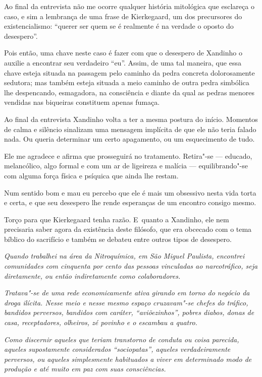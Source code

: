 \asterisc{}

Ao final da entrevista não me ocorre qualquer história mitológica que
esclareça o caso, e sim a lembrança de uma frase de Kierkegaard, um dos
precursores do existencialismo: ``querer ser quem se é realmente é na
verdade o oposto do desespero''.

Pois então, uma chave neste caso é fazer com que o desespero de Xandinho
o auxilie a encontrar seu verdadeiro ``eu''. Assim, de uma tal maneira,
que essa chave esteja situada na passagem pelo caminho da pedra concreta
dolorosamente sedutora; mas também esteja situada a meio caminho de
outra pedra simbólica lhe despencando, esmagadora, na consciência e
diante da qual as pedras menores vendidas nas biqueiras constituem
apenas fumaça.

Ao final da entrevista Xandinho volta a ter a mesma postura do início.
Momentos de calma e silêncio sinalizam uma mensagem implícita de que ele
não teria falado nada. Ou queria determinar um certo apagamento, ou um
esquecimento de tudo.

Ele me agradece e afirma que prosseguirá no tratamento. Retira"-se ---
educado, melancólico, algo formal e com um ar de ligeireza e malícia ---
equilibrando"-se com alguma força física e psíquica que ainda lhe restam.

Num sentido bom e mau eu percebo que ele é mais um obsessivo nesta vida
torta e certa, e que seu desespero lhe rende esperanças de um encontro
consigo mesmo.

Torço para que Kierkegaard tenha razão. E~quanto a Xandinho, ele nem
precisaria saber agora da existência deste filósofo, que era obcecado
com o tema bíblico do sacrifício e também se debateu entre outros tipos
de desespero.~

\asterisc{}


\emph{Quando trabalhei na área da Nitroquímica, em
São Miguel Paulista, encontrei comunidades com cinquenta por cento das
pessoas vinculadas ao narcotráfico, seja diretamente, ou então
indiretamente como colaboradores.}

\emph{Tratava"-se de uma rede economicamente ativa girando em torno do
negócio da droga ilícita. Nesse meio e nesse mesmo espaço cruzavam"-se
chefes do tráfico, bandidos perversos, bandidos com caráter,
``aviõezinhos'', pobres diabos, donas de casa, receptadores, olheiros,
zé povinho e o escambau a quatro.}

\emph{Como discernir aqueles que teriam transtorno
de conduta ou coisa parecida, aqueles supostamente considerados
``sociopatas'', aqueles verdadeiramente perversos, ou aqueles
simplesmente habituados a viver em determinado modo de produção e até
muito em paz com suas consciências.}


